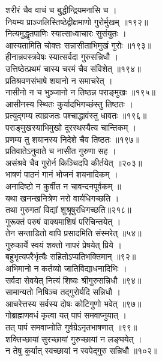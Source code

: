 शरीरं चैव वाचं च बुद्धीन्द्रियमनांसि च ।\\[-2mm]
नियम्य प्राञ्जलिस्तिष्ठेद्वीक्षमाणो गुरोर्मुखम् ॥१९२॥\\
नित्यमुद्धृतपाणिः स्यात्साध्वाचारः सुसंयुतः ।\\[-2mm]
आस्यतामिति चोक्तः सन्नासीताभिमुखं गुरोः ॥१९३॥\\
हीनान्नवस्त्रवेषः स्यात्सर्वदा गुरुसन्निधौ ।\\[-2mm]
उत्तिष्ठेत्प्रथमं चास्य चरमं चैव संविशेत् ॥१९४॥\\
प्रतिश्रवणसंभाषे शयानो न समाचरेत् ।\\[-2mm]
नासीनो न च भुञ्जानो न तिष्ठन्न पराङ्मुखः ॥१९५॥\\
आसीनस्य स्थितः कुर्यादभिगच्छंस्तु तिष्ठतः ।\\[-2mm]
प्रत्युद्गम्य त्वाव्रजतः पश्चाद्धावंस्तु धावतः ॥१९६॥\\
पराङ्मुखस्याभिमुखो दूरस्थस्यैत्य चान्तिकम् ।\\[-2mm]
प्रणम्य तु शयानस्य निदेशे चैव तिष्ठतः ॥१९७॥\\
प्रतिवातेऽनुवाते च नासीत गुरुणा सह ।\\[-2mm]
असंश्रवे चैव गुरोर्न किञ्चिदपि कीर्तयेत् ॥२०३॥\\
भाषणं पाठनं गानं भोजनं शयनादिकम् ।\\[-2mm]
अनादिष्टो न कुर्वीत न चावन्दनपूर्वकम् ॥\\
यथा खनन्खनित्रेण नरो वार्यधिगच्छति ।\\[-2mm]
तथा गुरुगतां विद्यां शुश्रूषुरधिगच्छति॥२१८॥\\
गुरूक्तं परुषं वाक्यमाशिषं परिचिन्तयेत् ।\\[-2mm]
तेन सन्ताडितो वापि प्रसादमिति संस्मरेत् ॥५४॥\\
गुरुकार्ये स्वयं शक्तो नापरं प्रेषयेत् प्रिये ।\\[-2mm]
बहुभृत्यपरैर्भृत्यैः सहितोऽप्यतिभक्तिमान् ॥९२॥\\
अभिमानो न कर्तव्यो जातिविद्याधनादिभिः ।\\[-2mm]
सर्वदा सेवयेत् नित्यं शिष्यः श्रीगुरुसन्निधौ ॥९४॥\\
सामान्यतो निषिञ्च तद्गुरोर्यदि सन्निधौ ।\\[-2mm]
आचरेत्तस्य सर्वस्य दोषः कोटिगुणो भवेत् ॥९७॥\\
गोब्राह्मणवधं कृत्वा यत् पापं समवाप्नुयात् ।\\[-2mm]
तत् पापं समवाप्नोति गुर्वग्रेऽनृतभाषणात् ॥९९॥\\
शक्तिच्छायां सुरच्छायां गुरुच्छायां न लङ्घयेत् ।\\[-2mm]
न तेषु कुर्यात् स्वच्छायां न स्वपेद्गुरु सन्निधौ ॥१०२॥\\
